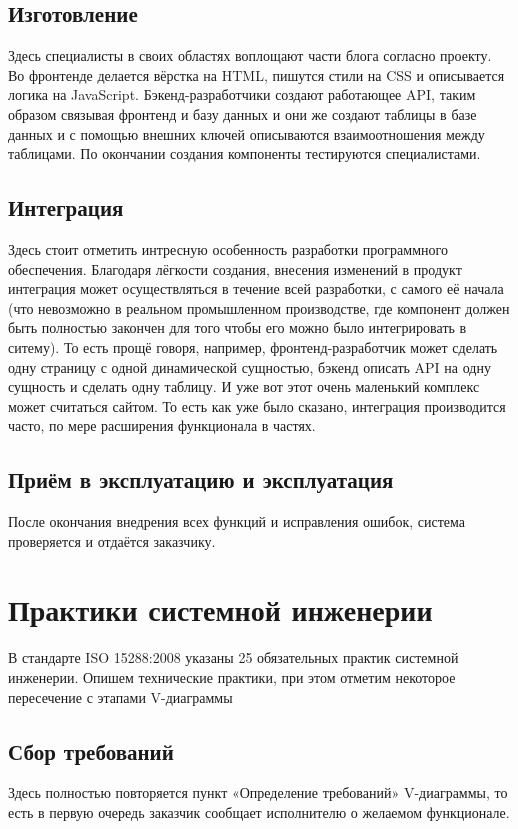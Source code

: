 \documentclass[bibliography=totocnumbered]{scrartcl}
\begin{document}
\subsection{Изготовление}
Здесь специалисты в своих областях воплощают части блога согласно проекту. Во фронтенде делается вёрстка на HTML, пишутся стили на CSS и описывается логика на JavaScript. Бэкенд-разработчики создают работающее API, таким образом связывая фронтенд и базу данных и они же создают таблицы в базе данных и с помощью внешних ключей описываются взаимоотношения между таблицами. По окончании создания компоненты тестируются специалистами.

\subsection{Интеграция}
Здесь стоит отметить интресную особенность разработки программного обеспечения. Благодаря лёгкости создания, внесения изменений в продукт интеграция может осуществляться в течение всей разработки, с самого её начала (что невозможно в реальном промышленном производстве, где компонент должен быть полностью закончен для того чтобы его можно было интегрировать в ситему). То есть прощё говоря, например, фронтенд-разработчик может сделать одну страницу с одной динамической сущностью, бэкенд описать API на одну сущность и сделать одну таблицу. И уже вот этот очень маленький комплекс может считаться сайтом. То есть как уже было сказано, интеграция производится часто, по мере расширения функционала в частях.

\subsection{Приём в эксплуатацию и эксплуатация}
После окончания внедрения всех функций и исправления ошибок, система проверяется и отдаётся заказчику.

\section{Практики системной инженерии}
В стандарте ISO 15288:2008 указаны 25 обязательных практик системной инженерии. Опишем технические практики, при этом отметим некоторое пересечение с этапами V-диаграммы

\subsection{Сбор требований}
Здесь полностью повторяется пункт «Определение требований» V-диаграммы, то есть в первую очередь заказчик сообщает исполнителю о желаемом функционале.
\end{document}
